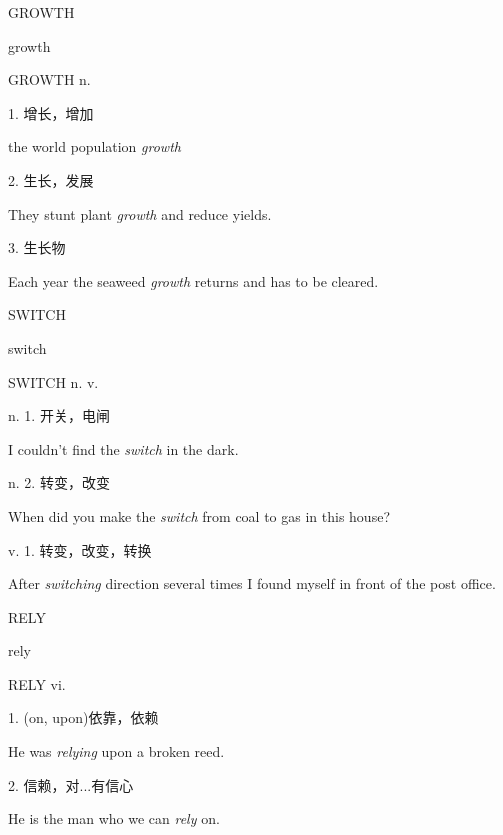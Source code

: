 \begin{flashcard}{
GROWTH

growth
}
\begin{center}
GROWTH n. 
\end{center}
1. 增长，增加

the world population \textit{growth}

2. 生长，发展

They stunt plant \textit{growth} and reduce yields.

3. 生长物

Each year the seaweed \textit{growth} returns and has to be cleared.

\end{flashcard}
\begin{flashcard}{
SWITCH

switch
}
\begin{center}
SWITCH n. v. 
\end{center}
n. 1. 开关，电闸

I couldn't find the \textit{switch} in the dark.

n. 2. 转变，改变

When did you make the \textit{switch} from coal to gas in this house?

v. 1. 转变，改变，转换

After \textit{switching} direction several times I found myself in front of the post office.

\end{flashcard}
\begin{flashcard}{
RELY

rely
}
\begin{center}
RELY vi. 
\end{center}
1. (on, upon)依靠，依赖

He was \textit{relying} upon a broken reed.

2. 信赖，对...有信心

He is the man who we can \textit{rely} on.

\end{flashcard}
